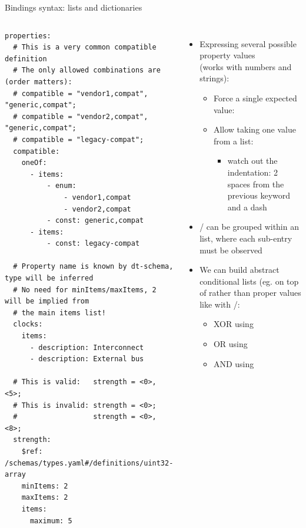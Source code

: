 \begin{frame}[fragile]{Bindings syntax: lists and dictionaries}
  \begin{columns}
    \begin{block}{}
      {\fontsize{5}{6}\selectfont
\begin{verbatim}
properties:
  # This is a very common compatible definition
  # The only allowed combinations are (order matters):
  # compatible = "vendor1,compat", "generic,compat";
  # compatible = "vendor2,compat", "generic,compat";
  # compatible = "legacy-compat";
  compatible:
    oneOf:
      - items:
          - enum:
              - vendor1,compat
              - vendor2,compat
          - const: generic,compat
      - items:
          - const: legacy-compat

  # Property name is known by dt-schema, type will be inferred
  # No need for minItems/maxItems, 2 will be implied from
  # the main items list!
  clocks:
    items:
      - description: Interconnect
      - description: External bus

  # This is valid:   strength = <0>, <5>;
  # This is invalid: strength = <0>;
  #                  strength = <0>, <8>;
  strength:
    $ref: /schemas/types.yaml#/definitions/uint32-array
    minItems: 2
    maxItems: 2
    items:
      maximum: 5
\end{verbatim}
      }
    \end{block}
    \begin{itemize}
    \item Expressing several possible property values\\
      (works with numbers and strings):
      \begin{itemize}
      \item Force a single expected value: 
      \item Allow taking one value from a list: 
        \begin{itemize}
        \item watch out the indentation: 2 spaces from the previous
          keyword and a dash
        \end{itemize}
      \end{itemize}
    \item {}/ can be grouped within an 
      list, where each  sub-entry must be observed
    \item We can build abstract conditional lists (eg. on top of
       rather than proper values like with
      /:
      \begin{itemize}
      \item XOR using 
      \item OR using 
      \item AND using 
      \end{itemize}
    \end{itemize}
  \end{columns}
\end{frame}

